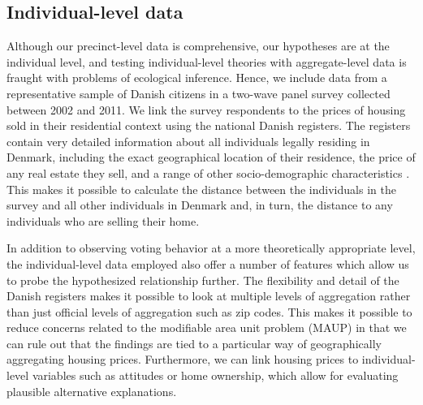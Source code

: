 \documentclass[12pt,a4paper]{article}
\begin{document}
	
	
	\subsection{Individual-level data}\label{individuallevel}
	
	Although our precinct-level data is comprehensive, our hypotheses are at the individual level, and testing individual-level theories with aggregate-level data is fraught with problems of ecological inference. Hence, we include data from a representative sample of Danish citizens in a two-wave panel survey collected between 2002 and 2011. We link the survey respondents to the prices of housing sold in their residential context using the national Danish registers. The registers contain very detailed information about all individuals legally residing in Denmark, including the exact geographical location of their residence, the price of any real estate they sell, and a range of other socio-demographic characteristics \citep{thygesen2011introduction}. This makes it possible to calculate the distance between the individuals in the survey and all other individuals in Denmark and, in turn, the distance to any individuals who are selling their home.
	
	In addition to observing voting behavior at a more theoretically appropriate level, the individual-level data employed also offer a number of features which allow us to probe the hypothesized relationship further. The flexibility and detail of the Danish registers makes it possible to look at multiple levels of aggregation rather than just official levels of aggregation such as zip codes. This makes it possible to reduce concerns related to the modifiable area unit problem (MAUP) in that we can rule out that the findings are tied to a particular way of geographically aggregating housing prices. Furthermore, we can link housing prices to individual-level variables such as attitudes or home ownership, which allow for evaluating plausible alternative explanations. %
	
\end{document}
